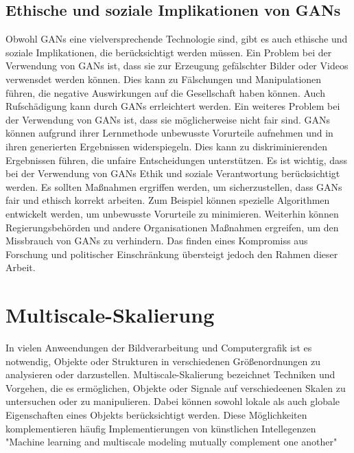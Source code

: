     \subsection{Ethische und soziale Implikationen von GANs}
    
        Obwohl GANs eine vielversprechende Technologie sind, gibt es auch ethische und soziale Implikationen, die berücksichtigt werden müssen.      
        Ein Problem bei der Verwendung von GANs ist, dass sie zur Erzeugung gefälschter Bilder oder Videos verwensdet werden können.      
        Dies kann zu Fälschungen und Manipulationen führen, die negative Auswirkungen auf die Gesellschaft haben können.
        Auch Rufschädigung kann durch GANs errleichtert werden.
        Ein weiteres Problem bei der Verwendung von GANs ist, dass sie möglicherweise nicht fair sind.      
        GANs können aufgrund ihrer Lernmethode unbewusste Vorurteile aufnehmen und in ihren generierten Ergebnissen widerspiegeln.      
        Dies kann zu diskriminierenden Ergebnissen führen, die unfaire Entscheidungen unterstützen.%
        Es ist wichtig, dass bei der Verwendung von GANs Ethik und soziale Verantwortung berücksichtigt werden.      
        Es sollten Maßnahmen ergriffen werden, um sicherzustellen, dass GANs fair und ethisch korrekt arbeiten.      
        Zum Beispiel können spezielle Algorithmen entwickelt werden, um unbewusste Vorurteile zu minimieren.      
        Weiterhin können Regierungsbehörden und andere Organisationen Maßnahmen ergreifen, um den Missbrauch von GANs zu verhindern.      
        Das finden eines Kompromiss aus Forschung und politischer Einschränkung übersteigt jedoch den Rahmen dieser Arbeit.      
    
\section{Multiscale-Skalierung}

    In vielen Anweendungen der Bildverarbeitung und Computergrafik ist es notwendig, Objekte oder Strukturen in verschiedenen Größenordnungen zu analysieren oder darzustellen.      
    Multiscale-Skalierung bezeichnet Techniken und Vorgehen, die es ermöglichen, Objekte oder Signale auf verschiedeenen Skalen zu untersuchen oder zu manipulieren.      
    Dabei können sowohl lokale als auch globale Eigenschaften eines Objekts berücksichtigt werden.
    Diese Möglichkeiten komplementieren häufig Implementierungen von künstlichen Intellegenzen
    "Machine learning and multiscale modeling mutually complement one another"
    
